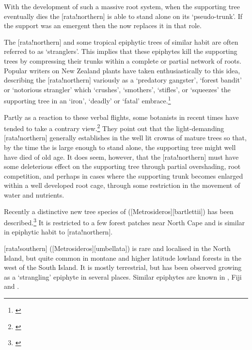 With the development of such a massive root system, when the supporting tree eventually dies the [rata!northern] is able to stand alone on its `pseudo-trunk'.
If the support was an emergent then the  now replaces it in that role.

The [rata!northern] and some tropical epiphytic trees of similar habit are often referred to as `stranglers'.
This implies that these epiphytes kill the supporting trees by compressing their trunks within a complete or partial network of roots.
Popular writers on New Zealand plants have taken enthusiastically to this idea, describing the [rata!northern] variously as a `predatory gangster', `forest bandit' or `notorious strangler' which `crushes', `smothers', `stifles', or `squeezes' the supporting tree in an `iron', `deadly' or `fatal' embrace.\footnote{\cite{druce1971uncle}}

Partly as a reaction to these verbal flights, some botanists in recent times have tended to take a contrary view.\footnote{\cite{zotov1948rata}}
They point out that the light-demanding [rata!northern] generally establishes in the well lit crowns of mature trees so that, by the time the  is large enough to stand alone, the supporting tree might well have died of old age.
It does seem, however, that the [rata!northern] must have some deleterious effect on the supporting tree through partial overshading, root competition, and perhaps in cases where the supporting trunk becomes enlarged within a well developed  root cage, through some restriction in the movement of water and nutrients.

Recently a distinctive new tree species of  ([Metrosideros][bartlettii]) has been described.\footnote{\cite{dawson1985metrosideros}}
It is restricted to a few forest patches near North Cape and is similar in epiphytic habit to [rata!northern].

[rata!southern] ([Metrosideros][umbellata]) is rare and localised in the North Island, but quite common in montane and higher latitude lowland forests in the west of the South Island.
It is mostly terrestrial, but has been observed growing as a `strangling' epiphyte in several places.
Similar  epiphytes are known in , Fiji and .

